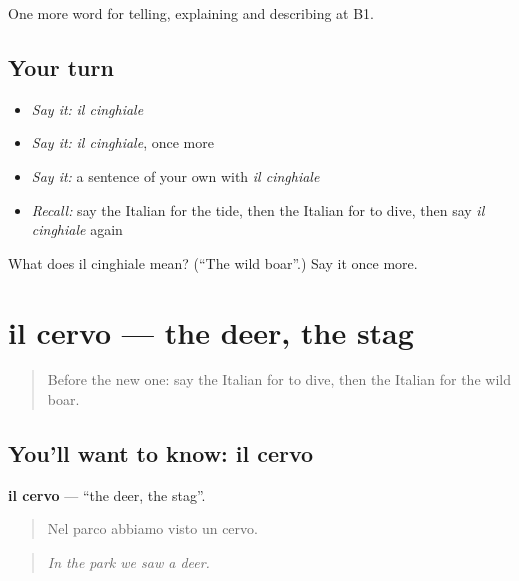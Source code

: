 \begin{grammarlens}[title={What you've built}]
One more word for telling, explaining and describing at B1.
\end{grammarlens}

\subsection*{Your turn}
\begin{itemize}
\raggedright
  \item \emph{Say it:} \emph{il cinghiale}
  \item \emph{Say it:} \emph{il cinghiale}, once more
  \item \emph{Say it:} a sentence of your own with \emph{il cinghiale}
  \item \emph{Recall:} say the Italian for the tide, then the Italian for to dive, then say \emph{il cinghiale} again
\end{itemize}

\begin{tcolorbox}[breakable,colback=teal!4,colframe=teal!35!black,title={Before you move on}]
What does il cinghiale mean? (\textquotedblleft{}The wild boar\textquotedblright{}.) Say it once more.
\end{tcolorbox}
\section[il cervo]{il cervo — the deer, the stag}

\label{lesson:IT-C464-cervo}



\begin{quote}
Before the new one: say the Italian for to dive, then the Italian for the wild boar.
\end{quote}

\subsection*{You'll want to know: il cervo}
\textbf{il cervo} — \textquotedblleft{}the deer, the stag\textquotedblright{}.

\begin{quote}
Nel parco abbiamo visto un cervo.
\end{quote}

\begin{quote}
\emph{In the park we saw a deer.}
\end{quote}

